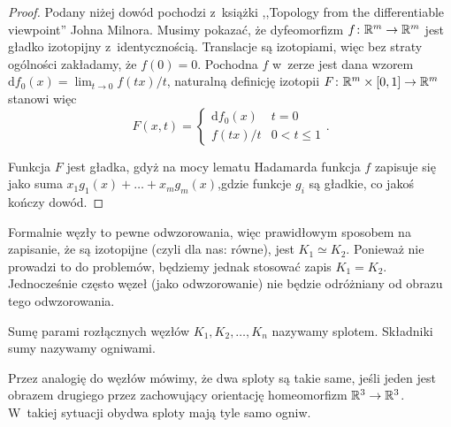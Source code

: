 \begin{proof}
    Podany niżej dowód pochodzi z~książki ,,Topology from the differentiable viewpoint'' Johna Milnora.
    Musimy pokazać, że dyfeomorfizm $f \colon \mathbb R^m \to \mathbb R^m$ jest gładko izotopijny z~identycznością.
    Translacje są izotopiami, więc bez straty ogólności zakładamy, że $f(0) = 0$.
    Pochodna $f$ w~zerze jest dana wzorem $\mathrm{d}f_0(x) = \lim_{t \to 0} f(tx) /t$,
    naturalną definicję izotopii $F \colon \mathbb R^m \times [0, 1] \to \mathbb R^m$ stanowi więc
    \[
        F(x, t) = \begin{cases}
            \mathrm{d}f_0(x) & t = 0 \\
            f(tx) / t & 0 < t \le 1
        \end{cases} .
    \]

    Funkcja $F$ jest gładka, gdyż na mocy lematu Hadamarda funkcja $f$ zapisuje się jako suma $x_1 g_1(x) + \ldots + x_mg_m(x)$,gdzie funkcje $g_i$ są gładkie, co jakoś kończy dowód.
\end{proof}

Formalnie węzły to pewne odwzorowania, więc prawidłowym sposobem na zapisanie, że są izotopijne (czyli dla nas: równe), jest $K_1 \simeq K_2$.
Ponieważ nie prowadzi to do problemów, będziemy jednak stosować zapis $K_1 = K_2$.
Jednocześnie często węzeł (jako odwzorowanie) nie będzie odróżniany od obrazu tego odwzorowania.

\begin{definition}
    \label{def_link}
    Sumę parami rozłącznych węzłów $K_1, K_2, \ldots, K_n$ nazywamy splotem.
    Składniki sumy nazywamy ogniwami.
\end{definition}

Przez analogię do węzłów mówimy, że dwa sploty są takie same, jeśli jeden jest obrazem drugiego przez zachowujący orientację homeomorfizm $\mathbb R^3 \to \mathbb R^3$.
W~takiej sytuacji obydwa sploty mają tyle samo ogniw.

